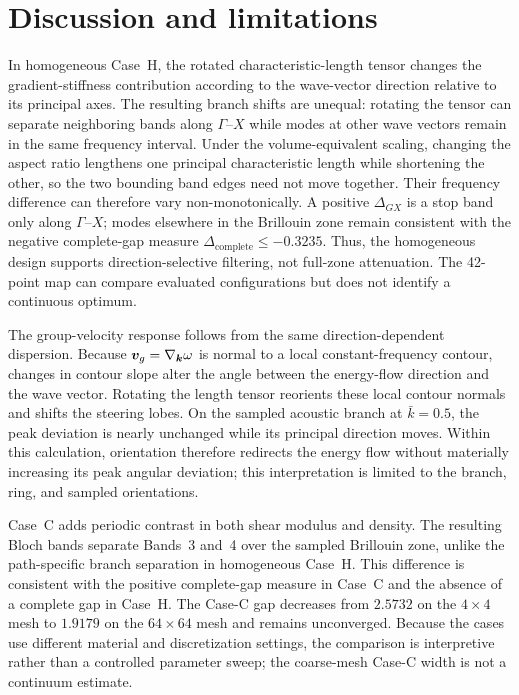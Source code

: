 \section{Discussion and limitations}
\label{sec:discussion}

In homogeneous Case~H, the rotated characteristic-length tensor changes the gradient-stiffness contribution according to the wave-vector direction relative to its principal axes. The resulting branch shifts are unequal: rotating the tensor can separate neighboring bands along $\Gamma$--$X$ while modes at other wave vectors remain in the same frequency interval. Under the volume-equivalent scaling, changing the aspect ratio lengthens one principal characteristic length while shortening the other, so the two bounding band edges need not move together. Their frequency difference can therefore vary non-monotonically. A positive $\Delta_{GX}$ is a stop band only along $\Gamma$--$X$; modes elsewhere in the Brillouin zone remain consistent with the negative complete-gap measure $\Delta_{\mathrm{complete}}\le -0.3235$. Thus, the homogeneous design supports direction-selective filtering, not full-zone attenuation. The 42-point map can compare evaluated configurations but does not identify a continuous optimum.

The group-velocity response follows from the same direction-dependent dispersion. Because $\bm{v}_g=\nabla_{\bm{k}}\omega$ is normal to a local constant-frequency contour, changes in contour slope alter the angle between the energy-flow direction and the wave vector. Rotating the length tensor reorients these local contour normals and shifts the steering lobes. On the sampled acoustic branch at $\bar{k}=0.5$, the peak deviation is nearly unchanged while its principal direction moves. Within this calculation, orientation therefore redirects the energy flow without materially increasing its peak angular deviation; this interpretation is limited to the branch, ring, and sampled orientations.

Case~C adds periodic contrast in both shear modulus and density. The resulting Bloch bands separate Bands~3 and~4 over the sampled Brillouin zone, unlike the path-specific branch separation in homogeneous Case~H. This difference is consistent with the positive complete-gap measure in Case~C and the absence of a complete gap in Case~H. The Case-C gap decreases from $2.5732$ on the $4\times4$ mesh to $1.9179$ on the $64\times64$ mesh and remains unconverged. Because the cases use different material and discretization settings, the comparison is interpretive rather than a controlled parameter sweep; the coarse-mesh Case-C width is not a continuum estimate.


